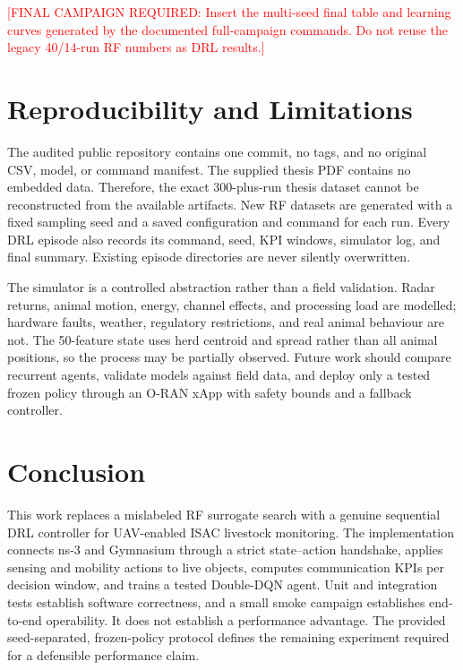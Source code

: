 \documentclass[10pt,conference]{IEEEtran}
\newcommand{\todoresult}[1]{\textcolor{red}{[FINAL CAMPAIGN REQUIRED: #1]}}
\begin{document}
\todoresult{Insert the multi-seed final table and learning curves generated by
the documented full-campaign commands. Do not reuse the legacy 40/14-run RF
numbers as DRL results.}

\section{Reproducibility and Limitations}

The audited public repository contains one commit, no tags, and no original
CSV, model, or command manifest. The supplied thesis PDF contains no embedded
data. Therefore, the exact 300-plus-run thesis dataset cannot be reconstructed
from the available artifacts. New RF datasets are generated with a fixed
sampling seed and a saved configuration and command for each run. Every DRL
episode also records its command, seed, KPI windows, simulator log, and final
summary. Existing episode directories are never silently overwritten.

The simulator is a controlled abstraction rather than a field validation.
Radar returns, animal motion, energy, channel effects, and processing load are
modelled; hardware faults, weather, regulatory restrictions, and real animal
behaviour are not. The 50-feature state uses herd centroid and spread rather
than all animal positions, so the process may be partially observed. Future
work should compare recurrent agents, validate models against field data, and
deploy only a tested frozen policy through an O-RAN xApp with safety bounds and
a fallback controller.

\section{Conclusion}

This work replaces a mislabeled RF surrogate search with a genuine sequential
DRL controller for UAV-enabled ISAC livestock monitoring. The implementation
connects ns-3 and Gymnasium through a strict state--action handshake, applies
sensing and mobility actions to live objects, computes communication KPIs per
decision window, and trains a tested Double-DQN agent. Unit and integration
tests establish software correctness, and a small smoke campaign establishes
end-to-end operability. It does not establish a performance advantage. The
provided seed-separated, frozen-policy protocol defines the remaining
experiment required for a defensible performance claim.
\end{document}

